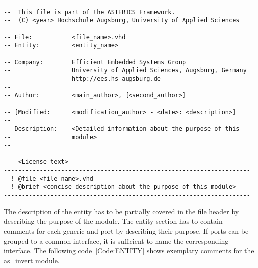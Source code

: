 \begin{lstlisting}[style=hdl, label=Code:HEADER, caption=\asterics header file]
---------------------------------------------------------------------
--  This file is part of the ASTERICS Framework. 
--  (C) <year> Hochschule Augsburg, University of Applied Sciences
---------------------------------------------------------------------
-- File:           <file_name>.vhd
-- Entity:         <entity_name>
--
-- Company:        Efficient Embedded Systems Group
--                 University of Applied Sciences, Augsburg, Germany
--                 http://ees.hs-augsburg.de
--
-- Author:         <main_author>, [<second_author>]
--
-- [Modified:      <modification_author> - <date>: <description>]
--
-- Description:    <Detailed information about the purpose of this 
--                 module>
--                 
---------------------------------------------------------------------
--  <License text>
---------------------------------------------------------------------
--! @file <file_name>.vhd
--! @brief <concise description about the purpose of this module>
---------------------------------------------------------------------
\end{lstlisting}

The description of the entity has to be partially covered in the file header by describing the purpose of the module.
The entity section has to contain comments for each generic and port by describing their purpose.
If ports can be grouped to a common interface, it is sufficient to name the corresponding interface.
The following code~\ref{Code:ENTITY} shows exemplary comments for the as\_invert module.

